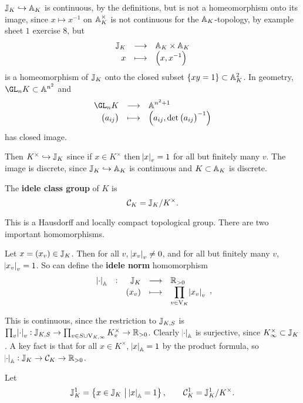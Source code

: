 \begin{remark*}
$ \JJ_K \hookrightarrow \AA_K $ is continuous, by the definitions, but is not a homeomorphism onto its image, since $ x \mapsto x^{-1} $ on $ \AA_K^\times $ is not continuous for the $ \AA_K $-topology, by example sheet $ 1 $ exercise $ 8 $, but
$$ \function{\JJ_K}{\AA_K \times \AA_K}{x}{\br{x, x^{-1}}} $$
is a homeomorphism of $ \JJ_K $ onto the closed subset $ \cbr{xy = 1} \subset \AA_K^2 $. In geometry, $ \GL_n K \subset \AA^{n^2} $ and
$$ \function{\GL_n K}{\AA^{n^2 + 1}}{\br{a_{ij}}}{\br{a_{ij}, \det \br{a_{ij}}^{-1}}} $$
has closed image.
\end{remark*}

Then $ K^\times \hookrightarrow \JJ_K $ since if $ x \in K^\times $ then $ \abs{x}_v = 1 $ for all but finitely many $ v $. The image is discrete, since $ \JJ_K \hookrightarrow \AA_K $ is continuous and $ K \subset \AA_K $ is discrete.

\pagebreak


\begin{definition*}
The \textbf{idele class group} of $ K $ is
$$ \CCC_K = \JJ_K / K^\times. $$
\end{definition*}

This is a Hausdorff and locally compact topological group. There are two important homomorphisms.

\begin{definition*}
Let $ x = \br{x_v} \in \JJ_K $. Then for all $ v $, $ \abs{x_v}_v \ne 0 $, and for all but finitely many $ v $, $ \abs{x_v}_v = 1 $. So can define the \textbf{idele norm} homomorphism
$$ \function[\abs{\cdot}_\AA]{\JJ_K}{\RR_{> 0}}{\br{x_v}}{\prod_{v \in \V_K} \abs{x_v}_v}, $$
\end{definition*}

This is continuous, since the restriction to $ \JJ_{K, S} $ is $ \prod_v \abs{\cdot}_v : \JJ_{K, S} \to \prod_{v \in S \cup \V_{K, \infty}} K_v^\times \to \RR_{> 0} $. Clearly $ \abs{\cdot}_\AA $ is surjective, since $ K_\infty^\times \subset \JJ_K $. A key fact is that for all $ x \in K^\times $, $ \abs{x}_\AA = 1 $ by the product formula, so $ \abs{\cdot}_\AA : \JJ_K \to \CCC_K \to \RR_{> 0} $.

\begin{definition*}
Let
$$ \JJ_K^1 = \cbr{x \in \JJ_K \st \abs{x}_\AA = 1}, \qquad \CCC_K^1 = \JJ_K^1 / K^\times. $$
\end{definition*}

